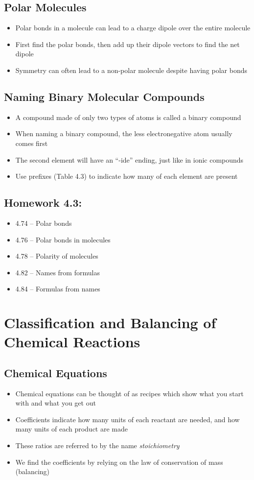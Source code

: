 \documentclass[12pt, openany, letterpaper]{memoir}
\begin{document}
\section{Polar Molecules}
\begin{itemize}
	\item Polar bonds in a molecule can lead to a charge dipole over the entire molecule
	\item First find the polar bonds, then add up their dipole vectors to find the net dipole
	\item Symmetry can often lead to a non-polar molecule despite having polar bonds
\end{itemize}

\section{Naming Binary Molecular Compounds}
\begin{itemize}
	\item A compound made of only two types of atoms is called a binary compound
	\item When naming a binary compound, the less electronegative atom usually comes first
	\item The second element will have an ``-ide'' ending, just like in ionic compounds
	\item Use prefixes (Table 4.3) to indicate how many of each element are present
\end{itemize}

\section*{Homework 4.3:}
\begin{itemize}
  \item 4.74 -- Polar bonds
  \item 4.76 -- Polar bonds in molecules
  \item 4.78 -- Polarity of molecules
  \item 4.82 -- Names from formulas
  \item 4.84 -- Formulas from names
\end{itemize}

\chapter{Classification and Balancing of Chemical Reactions}
\section{Chemical Equations}
\begin{itemize}
	\item Chemical equations can be thought of as recipes which show what you start with and what you get out
	\item Coefficients indicate how many units of each reactant are needed, and how many units of each product are made
  \item These ratios are referred to by the name \emph{stoichiometry}
	\item We find the coefficients by relying on the law of conservation of mass (balancing)
\end{itemize}
\end{document}
